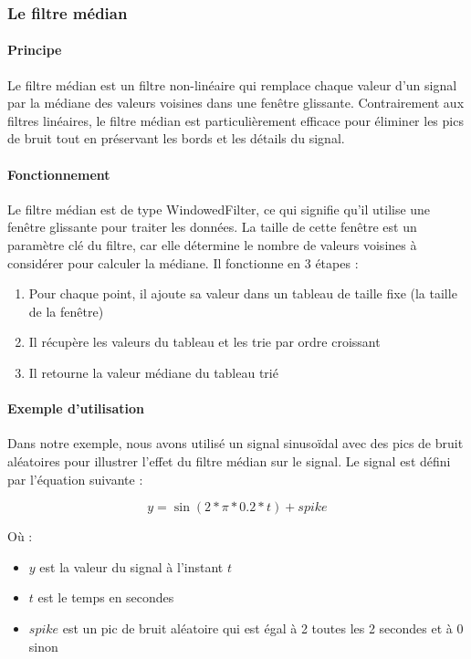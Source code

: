 \subsubsection{Le filtre médian}
\label{sec:filtre_median}

\paragraph{Principe}

Le filtre médian est un filtre non-linéaire qui remplace chaque valeur d'un signal par la médiane des valeurs voisines dans une fenêtre glissante. Contrairement aux filtres linéaires, le filtre médian est particulièrement efficace pour éliminer les pics de bruit tout en préservant les bords et les détails du signal. \\

\paragraph{Fonctionnement}

Le filtre médian est de type WindowedFilter, ce qui signifie qu'il utilise une fenêtre glissante pour traiter les données. La taille de cette fenêtre est un paramètre clé du filtre, car elle détermine le nombre de valeurs voisines à considérer pour calculer la médiane. Il fonctionne en 3 étapes :
\begin{enumerate}
    \item Pour chaque point, il ajoute sa valeur dans un tableau de taille fixe (la taille de la fenêtre)
    \item Il récupère les valeurs du tableau et les trie par ordre croissant
    \item Il retourne la valeur médiane du tableau trié
\end{enumerate}

\paragraph{Exemple d'utilisation}

Dans notre exemple, nous avons utilisé un signal sinusoïdal avec des pics de bruit aléatoires pour illustrer l'effet du filtre médian sur le signal. Le signal est défini par l'équation suivante : 

$$y = \sin(2 * \pi * 0.2 * t) + spike$$

Où : 
\begin{itemize}
    \item $y$ est la valeur du signal à l'instant $t$
    \item $t$ est le temps en secondes
    \item $spike$ est un pic de bruit aléatoire qui est égal à 2 toutes les 2 secondes et à 0 sinon
\end{itemize}

